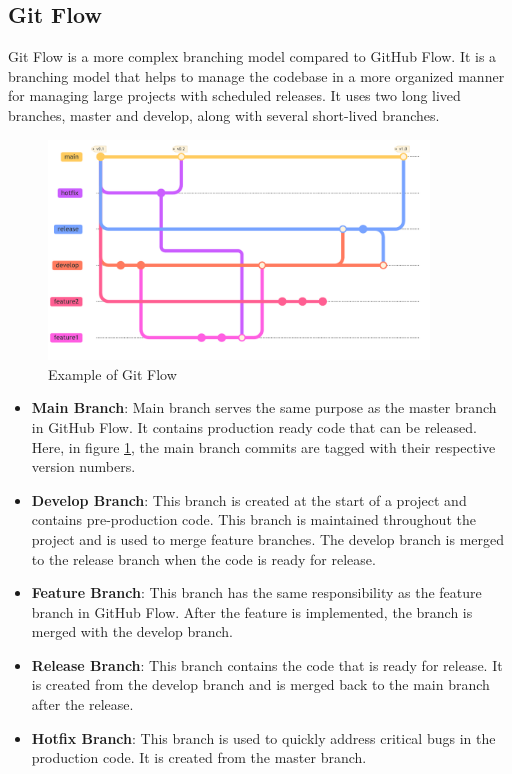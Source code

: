 \subsection{Git Flow}
Git Flow is a more complex branching model compared to GitHub Flow. It is a branching model that helps to manage the codebase in a more organized manner for
managing large projects with scheduled releases. It uses two long lived branches, master and develop, along with several short-lived branches.
\begin{figure}[!ht]
    \centering
    \includegraphics[width=0.9\textwidth]{Images/git_flow.pdf}
    \caption{Example of Git Flow}
    \label{git_flow}
\end{figure}
 \begin{itemize}
    \item \textbf{Main Branch}:\newline
    Main branch serves the same purpose as the master branch in GitHub Flow. It contains production ready code that can be released. Here, in figure \ref{git_flow},
    the main branch commits are tagged with their respective version numbers.

    \item \textbf{Develop Branch}:\newline
    This branch is created at the start of a project and contains pre-production code. This branch is maintained throughout the project and is used to merge 
    feature branches. The develop branch is merged to the release branch when the code is ready for release.

    \item \textbf{Feature Branch}:\newline
    This branch has the same responsibility as the feature branch in GitHub Flow. After the feature is implemented, the branch is merged with the develop branch.
 
    \item \textbf{Release Branch}:\newline
    This branch contains the code that is ready for release. It is created from the develop branch and is merged back to the main branch after the release.

    \item \textbf{Hotfix Branch}:\newline
    This branch is used to quickly address critical bugs in the production code. It is created from the master branch.
\end{itemize}

